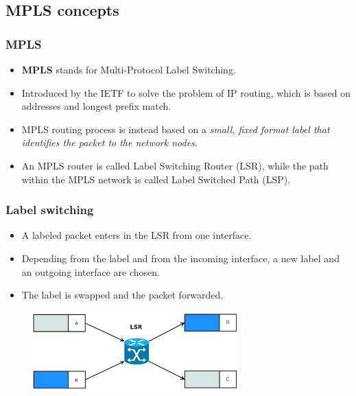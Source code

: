 \documentclass{beamer}
\begin{document}
\subsection{MPLS concepts}
\frame
{
  \frametitle{MPLS}
  
  \begin{itemize}
  \item<1-> \textbf{MPLS} stands for Multi-Protocol Label Switching.
  \item<2-> Introduced by the IETF to solve the problem of IP routing,
    which is based on addresses and longest prefix match.
  \item<3-> MPLS routing process is instead based on a \textit{small,
      fixed format label that identifies the packet to the network
      nodes}.
  \item<4-> An MPLS router is called Label Switching Router (LSR),
    while the path within the MPLS network is called Label Switched
    Path (LSP).
  \end{itemize}
}
\frame
{
  \frametitle{Label switching}

  \begin{itemize}
  \item<1-> A labeled packet enters in the LSR from one interface.
  \item<2-> Depending from the label and from the incoming interface, a new
    label and an outgoing interface are chosen.
  \item<3-> The label is swapped and the packet forwarded.
  \end{itemize}
  
  \begin{figure}[!hbp]
    \centering
    \includegraphics[width=0.7\textwidth]{img/label_switching}
  \end{figure}
}
\frame
\end{document}
